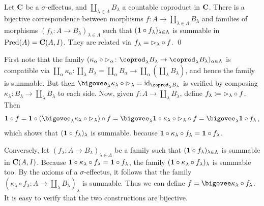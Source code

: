 \documentclass[%
	submission,
copyright,creativecommons,UKenglish]{eptcs}
\begin{document}
\begin{lemma}
\label{lem:decomposition-bijection}
Let $\mathbf{C}$ be a $\sigma$-effectus,
and $\coprod_{\lambda\in\Lambda} B_{\lambda}$
a countable coproduct in $\mathbf{C}$.
There is a bijective correspondence
between morphisms $f\colon A\to \coprod_{\lambda\in\Lambda} B_{\lambda}$
and families of morphisms
$(f_{\lambda}\colon A\to B_{\lambda})_{\lambda\in\Lambda}$
such that $(\mathbf{1} \circ f_{\lambda})_{\lambda\in\Lambda}$
is summable in $\mathrm{Pred}(A)=\mathbf{C}(A,I)$.
They are related via $f_{\lambda}=\mathord{\vartriangleright}_{\lambda}\circ f$.
\qed
\end{lemma}
\begin{Auxproof}
First note that the family
$(\kappa_{\alpha}\circ \pproj_{\alpha}\colon
\coprod_{\lambda} B_{\lambda}\to
\coprod_{\lambda} B_{\lambda})_{\alpha\in\Lambda}$
is compatible via
$\coprod_{\alpha}\kappa_{\alpha}\colon
\coprod_{\lambda} B_{\lambda}
=
\coprod_{\alpha} B_{\alpha}
\to
\coprod_{\alpha}
(\coprod_{\lambda} B_{\lambda})$,
and hence the family is summable.
But then
$\bigovee_{\lambda}\kappa_{\lambda}\circ \pproj_{\lambda}
=\id_{\coprod_{\lambda} B_{\lambda}}$
is verified by composing $\kappa_{\lambda}\colon
B_{\lambda}\to \coprod_{\lambda} B_{\lambda}$
to each side.
Now, given $f\colon A\to \coprod_{\lambda} B_{\lambda}$,
define $f_{\lambda}\coloneqq \mathord{\vartriangleright}_{\lambda}\circ f$.
Then
\[\textstyle
\truth\circ f
= \truth\circ (\bigovee_{\lambda}\kappa_{\lambda}\circ \pproj_{\lambda})
\circ f
= \bigovee_{\lambda}\truth\circ \kappa_{\lambda}\circ \pproj_{\lambda}\circ f
= \bigovee_{\lambda}\truth\circ f_{\lambda}
\mpunct,
\]
which shows that
$(\mathbf{1} \circ f_{\lambda})_{\lambda}$ is summable.
because $\mathbf{1}\circ\kappa_{\lambda}\circ f_{\lambda}=
\mathbf{1}\circ f_{\lambda}$.

Conversely,
let $(f_{\lambda}\colon A\to B_{\lambda})_{\lambda\in\Lambda}$
be a family such that
$(\mathbf{1} \circ f_{\lambda})_{\lambda\in\Lambda}$
is summable in $\mathbf{C}(A,I)$.
Because $\mathbf{1}\circ\kappa_{\lambda}\circ f_{\lambda}=
\mathbf{1}\circ f_{\lambda}$,
the family
$(\mathbf{1} \circ \kappa_{\lambda}\circ f_{\lambda})_{\lambda}$
is summable too.
By the axioms of a $\sigma$-effectus,
it follows that the family
$(\kappa_{\lambda}\circ f_{\lambda}\colon A\to \coprod_{\lambda} B_{\lambda})_{\lambda}$ is summable.
Thus we can define $f=\bigovee \kappa_{\lambda}\circ f_{\lambda}$.
It is easy to verify that the two constructions
are bijective.
\end{Auxproof}
\end{document}
